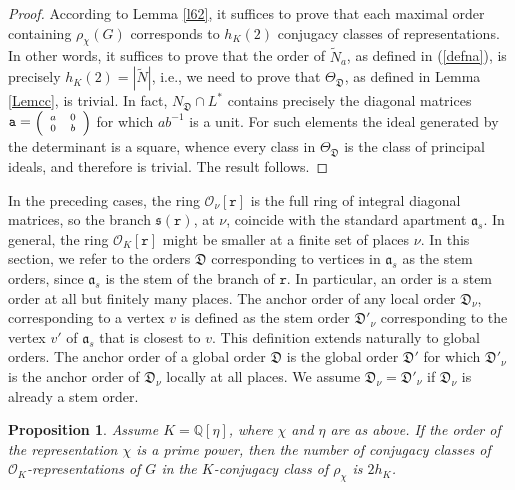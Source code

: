 \documentclass{article}
\newtheorem{Prop}{Proposition}[section]
\theoremstyle{definition}
\theoremstyle{remark}
\newcommand\sbmattrix[4]{\textnormal{\scriptsize$\left(\begin{array}{cc}#1&#2\\#3&#4\end{array}\right)$\normalsize}}
\begin{document}
\begin{proof}
    According to Lemma \ref{l62}, it suffices to prove that each maximal
    order containing  $\rho_\chi(G)$ corresponds to
    $h_K(2)$ conjugacy classes of representations.
    In other words, it suffices to prove that the order of
    $\tilde{N}_a$, as defined in (\ref{defna}), is precisely
    $h_K(2)=|\tilde{N}|$, i.e., we need to prove that
    $\Theta_{\mathfrak{D}}$, as defined in Lemma \ref{Lemcc},
    is trivial. In fact, $N_{\mathfrak{D}}\cap L^*$ contains precisely the 
    diagonal matrices $\mathtt{a}=\sbmattrix a00b$ for which $ab^{-1}$
    is a unit. For such elements the ideal generated by the determinant is a square,
    whence every class in $\Theta_{\mathfrak{D}}$ is the class of principal
    ideals, and therefore is trivial. The result follows.
\end{proof}

In the preceding cases, the ring $\mathcal{O}_\nu[\mathtt{r}]$
is the full ring of integral diagonal matrices, so the branch 
$\mathfrak{s}(\mathtt{r})$, at $\nu$, coincide with
the standard apartment $\mathfrak{a}_s$. In general, the ring
$\mathcal{O}_K[\mathtt{r}]$ might be smaller at a finite
set of places $\nu$. In this section, we refer to the orders 
$\mathfrak{D}$ corresponding to vertices in $\mathfrak{a}_s$ as
the stem orders, since $\mathfrak{a}_s$ is the stem of the branch of $\mathtt{r}$. In particular, an order is a stem order at all
but finitely many places. The anchor order of any local order $\mathfrak{D}_\nu$, corresponding to a vertex $v$ is defined 
as the stem order $\mathfrak{D}'_\nu$ corresponding to the vertex
$v'$ of $\mathfrak{a}_s$ that is closest to $v$. This definition
extends naturally to global orders. The anchor order of a
global order $\mathfrak{D}$ is the global order $\mathfrak{D}'$
for which $\mathfrak{D}'_\nu$ is the anchor order of
$\mathfrak{D}_\nu$ locally at all places. We assume
$\mathfrak{D}_\nu=\mathfrak{D}'_\nu$ if $\mathfrak{D}_\nu$
is already a stem order.
 

\begin{Prop}\label{p64}
    Assume $K=\mathbb{Q}[\eta ]$, where $\chi$ and $\eta $
    are as above.
    If the order of the representation $\chi$ is a prime power,
    then the number of conjugacy classes of 
    $\mathcal{O}_K$-representations of $G$ in the
    $K$-conjugacy class of $\rho_\chi$ is $2h_K$. 
\end{Prop}
\end{document}
